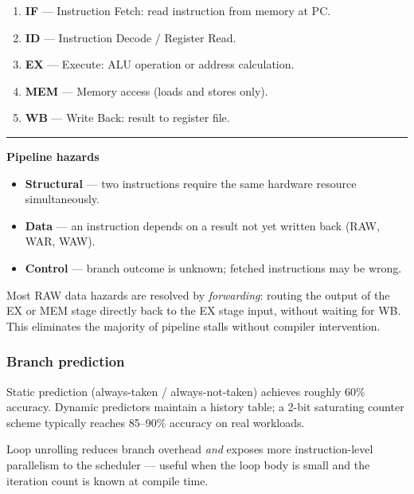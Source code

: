 \documentclass[12pt,a4paper]{article}
\newcommand{\concept}[1]{%
  \noindent\textcolor{AnthGreen}{\rule{3pt}{10pt}}\enspace
  \textbf{\color{AnthDark}#1}\par\vspace{2pt}%
}
\newenvironment{Note}[1][Note]{%
  \begin{tcolorbox}[notebox, title=#1]}{\end{tcolorbox}}
\newenvironment{Tip}[1][Tip]{%
  \begin{tcolorbox}[tipbox, title=#1]}{\end{tcolorbox}}
\begin{document}
\begin{enumerate}
  \item \textbf{IF} — Instruction Fetch: read instruction from memory at PC.
  \item \textbf{ID} — Instruction Decode / Register Read.
  \item \textbf{EX} — Execute: ALU operation or address calculation.
  \item \textbf{MEM} — Memory access (loads and stores only).
  \item \textbf{WB} — Write Back: result to register file.
\end{enumerate}

\concept{Pipeline hazards}

\begin{itemize}
  \item \textbf{Structural} — two instructions require the same hardware resource simultaneously.
  \item \textbf{Data} — an instruction depends on a result not yet written back (RAW, WAR, WAW).
  \item \textbf{Control} — branch outcome is unknown; fetched instructions may be wrong.
\end{itemize}

\begin{Note}[Forwarding / bypassing]
  Most RAW data hazards are resolved by \emph{forwarding}: routing the output of the
  EX or MEM stage directly back to the EX stage input, without waiting for WB.
  This eliminates the majority of pipeline stalls without compiler intervention.
\end{Note}

\subsubsection{Branch prediction}

Static prediction (always-taken / always-not-taken) achieves roughly 60\% accuracy.
Dynamic predictors maintain a history table; a 2-bit saturating counter scheme
typically reaches 85–90\% accuracy on real workloads.

\begin{Tip}[Loop unrolling]
  Loop unrolling reduces branch overhead \emph{and} exposes more instruction-level
  parallelism to the scheduler — useful when the loop body is small and the iteration
  count is known at compile time.
\end{Tip}

\end{document}
